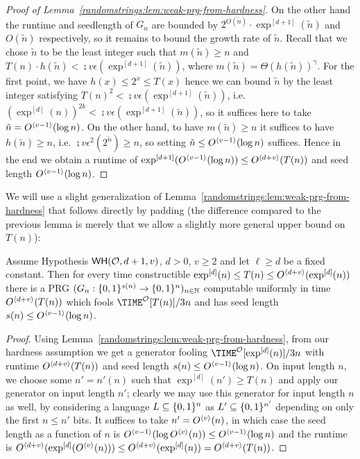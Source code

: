 \begin{proof}[Proof of Lemma~\ref{randomstrings:lem:weak-prg-from-hardness}]
On the other hand the runtime and seedlength of $G_n$ are bounded by $2^{O(\tilde{n})} \cdot \exp^{[d+1]}(\tilde{n})$ and $O(\tilde{n})$ respectively, so it remains to bound the growth rate of $\tilde{n}$. Recall that we chose $\tilde{n}$ to be the least integer such that $m(\tilde{n}) \geq n$ and  $T(n) \cdot h(\tilde{n}) < \semi{v}{\epsilon}(\exp^{[d+1]}(\tilde{n}))$, where $m(\tilde{n}) = \Theta(h(\tilde{n}))^\gamma$. For the first point, we have $h(x) \leq 2^{x} \leq T(x)$ hence we can bound $\tilde{n}$ by the least integer satisfying $T(n)^2 < \semi{v}{\epsilon}(\exp^{[d+1]}( \tilde{n}))$, i.e. $(\exp^{[d]}(n))^{2k} < \semi{v}{\epsilon}(\exp^{[d+1]}( \tilde{n}))$, so it suffices here to take $\tilde{n} = O^{\langle v-1 \rangle}(\log n)$. On the other hand, to have $m(\tilde{n}) \geq n$ it suffices to have $h(\tilde{n}) \geq n$, i.e. $\semi{v}{\epsilon^2}(2^{\tilde{n}}) \geq n$, so setting $\tilde{n} \leq O^{\langle v-1 \rangle}(\log n)$ suffices. Hence in the end we obtain a runtime of $\exp^{[d+1]}(O^{\langle v-1 \rangle}(\log n)) \leq O^{\langle d+v \rangle}(T(n))$ and seed length $O^{\langle v-1 \rangle}(\log n)$. 

\end{proof}

We will use a slight generalization of Lemma~\ref{randomstrings:lem:weak-prg-from-hardness} that follows directly by padding (the difference compared to the previous lemma is merely that we allow a slightly more general upper bound on $T(n)$):
\begin{corollary}\label{randomstrings:cor:scaled-weak}
Assume Hypothesis $\mathsf{WH}(\mathcal{O},d+1,v)$, $d> 0$, $v \geq 2$ and let $\ell \geq d$ be a fixed constant. Then for every time constructible $\exp^{[d]}(n)  \leq T(n) \leq O^{\langle d + v \rangle}(\exp^{[d]}(n))$ there is a PRG $(G_n: \{0,1\}^{s(n)} \to \{0,1\}^n)_{n \in \mathbb{N}}$ computable uniformly in time $O^{\langle d+v \rangle}(T(n))$ which fools $\TIME^{\mathcal{O}}[T(n)]/3n $ and has seed length $s(n) \leq O^{\langle v-1 \rangle}(\log n)$. 
\end{corollary}
\begin{proof}
Using Lemma~\ref{randomstrings:lem:weak-prg-from-hardness}, from our hardness assumption we get a generator fooling $\TIME^\mathcal{O}[\exp^{[d]}(n)]/3n$ with runtime $O^{\langle d+v \rangle}(T(n))$ and seed length $s(n) \leq O^{\langle v-1 \rangle}(\log n)$. On input length $n$, we choose some $n' = n'(n)$ such that $\exp^{[d]}(n') \geq T(n)$ and apply our generator on input length $n'$; clearly we may use this generator for input length $n$ as well, by considering a language $L \subseteq \{0,1\}^n$ as $L' \subseteq \{0,1\}^{n'}$ depending on only the first $n \leq n'$ bits. It suffices to take $n' =O^{\langle v \rangle}(n)$, in which case the seed length as a function of $n$ is $O^{\langle v-1 \rangle}(\log O^{\langle v \rangle}(n)) \leq O^{\langle v-1 \rangle}(\log n)$ and the runtime is $O^{\langle d+v \rangle}(\exp^{[d]}(O^{\langle v \rangle}(n))) \leq O^{\langle d + v \rangle}(\exp^{[d]}(n)) = O^{\langle d + v \rangle}(T(n))$.
\end{proof}

